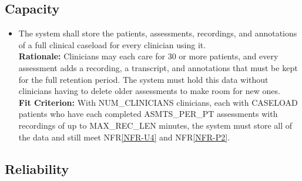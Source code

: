 \documentclass[12pt]{article}
\newcounter{nfrnum} %
\newcommand{\rthenfrnum}{NFR\thenfrnum}
\newcommand{\nfrref}[1]{NFR\ref{#1}}
\begin{document}
\subsection{Capacity}

\noindent \begin{itemize}

\item[\textbf{\rthenfrnum}:]
\label{NFR-CA1}
  The system shall store the patients, assessments, recordings, and annotations of a full clinical caseload for every clinician using it.
  \\ \textbf{Rationale:} Clinicians may each care for 30 or more patients, and every assessment adds a recording, a transcript, and annotations that must be kept for the full retention period. The system must hold this data without clinicians having to delete older assessments to make room for new ones.
  \\ \textbf{Fit Criterion:} With NUM\_CLINICIANS clinicians, each with CASELOAD patients who have each completed ASMTS\_PER\_PT assessments with recordings of up to MAX\_REC\_LEN minutes, the system must store all of the data and still meet \nfrref{NFR-U4} and \nfrref{NFR-P2}.

\end{itemize}

\subsection{Reliability}
\end{document}
